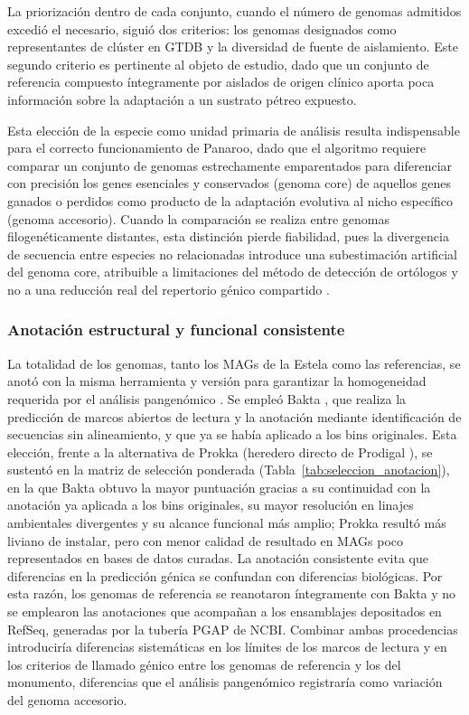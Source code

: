 La priorización dentro de cada conjunto, cuando el número de genomas admitidos excedió el necesario, siguió dos criterios: los genomas designados como representantes de clúster en GTDB y la diversidad de fuente de aislamiento. Este segundo criterio es pertinente al objeto de estudio, dado que un conjunto de referencia compuesto íntegramente por aislados de origen clínico aporta poca información sobre la adaptación a un sustrato pétreo expuesto.

Esta elección de la especie como unidad primaria de análisis resulta indispensable para el correcto funcionamiento de Panaroo, dado que el algoritmo requiere comparar un conjunto de genomas estrechamente emparentados para diferenciar con precisión los genes esenciales y conservados (genoma core) de aquellos genes ganados o perdidos como producto de la adaptación evolutiva al nicho específico (genoma accesorio). Cuando la comparación se realiza entre genomas filogenéticamente distantes, esta distinción pierde fiabilidad, pues la divergencia de secuencia entre especies no relacionadas introduce una subestimación artificial del genoma core, atribuible a limitaciones del método de detección de ortólogos y no a una reducción real del repertorio génico compartido \cite{panaroo2020}.

\subsubsection{Anotación estructural y funcional consistente}

La totalidad de los genomas, tanto los MAGs de la Estela como las referencias, se anotó con la misma herramienta y versión para garantizar la homogeneidad requerida por el análisis pangenómico \cite{panaroo2020}. Se empleó Bakta \cite{schwengers2021}, que realiza la predicción de marcos abiertos de lectura y la anotación mediante identificación de secuencias sin alineamiento, y que ya se había aplicado a los bins originales. Esta elección, frente a la alternativa de Prokka \cite{prokka2014} (heredero directo de Prodigal \cite{Hyatt2010}), se sustentó en la matriz de selección ponderada (Tabla~\ref{tab:seleccion_anotacion}), en la que Bakta obtuvo la mayor puntuación gracias a su continuidad con la anotación ya aplicada a los bins originales, su mayor resolución en linajes ambientales divergentes y su alcance funcional más amplio; Prokka resultó más liviano de instalar, pero con menor calidad de resultado en MAGs poco representados en bases de datos curadas. La anotación consistente evita que diferencias en la predicción génica se confundan con diferencias biológicas. Por esta razón, los genomas de referencia se reanotaron íntegramente con Bakta y no se emplearon las anotaciones que acompañan a los ensamblajes depositados en RefSeq, generadas por la tubería PGAP de NCBI. Combinar ambas procedencias introduciría diferencias sistemáticas en los límites de los marcos de lectura y en los criterios de llamado génico entre los genomas de referencia y los del monumento, diferencias que el análisis pangenómico registraría como variación del genoma accesorio.

